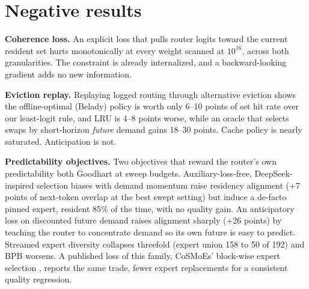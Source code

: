 \documentclass{article}
\begin{document}
\section{Negative results}\label{app:negatives}

\textbf{Coherence loss.} An explicit loss that pulls router logits toward the current resident
set hurts monotonically at every weight scanned at $10^{16}$, across both granularities. The
constraint is already internalized, and a backward-looking gradient adds no new information.

\textbf{Eviction replay.} Replaying logged routing through alternative eviction shows the
offline-optimal (Belady) policy is worth only 6--10 points of set hit rate over our least-logit
rule, and LRU is 4--8 points worse, while an oracle that selects swaps by short-horizon
\emph{future} demand gains 18--30 points. Cache policy is nearly saturated. Anticipation is not.

\textbf{Predictability objectives.} Two objectives that reward the router's own predictability
both Goodhart at sweep budgets. Auxiliary-loss-free, DeepSeek-inspired selection biases
\cite{wang2024auxfree} with demand momentum raise residency alignment (+7 points of next-token
overlap at the best swept setting) but induce a de-facto pinned expert, resident 85\% of the
time, with no quality gain. An anticipatory loss on discounted future demand raises alignment
sharply (+26 points) by teaching the router to concentrate demand so its own future is easy to
predict. Streamed expert diversity collapses threefold (expert union 158 to 50 of 192) and BPB
worsens. A published loss of this family, CoSMoEs' block-wise expert selection
\cite{huber2025cosmoes}, reports the same trade, fewer expert replacements for a consistent
quality regression.
\end{document}
